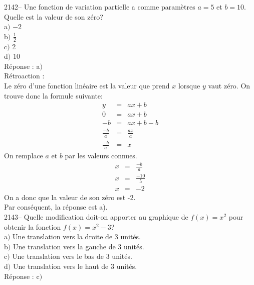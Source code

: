 \documentclass[letterpaper, 12pt]{article}
\begin{document}
2142-- Une fonction de variation partielle a comme param\`etres $a=5$ et $b=10$. Quelle est la valeur de son z\'ero?\\

a$)$ $-2$\\[2mm]
b$)$ $\frac{1}{2}$\\[2mm]
c$)$ 2\\[2mm]
d$)$ 10\\

R\'eponse : a$)$\\

R\'etroaction :\\
Le z\'ero d'une fonction lin\'eaire est la valeur que prend $x$ lorsque $y$ vaut z\'ero. On trouve donc la formule suivante:
\begin{eqnarray*}
 y&=&ax+b\\
 0&=&ax+b\\
 -b&=&ax+b-b\\
 \frac{-b}{a}&=&\frac{ax}{a}\\
 \frac{-b}{a}&=&x
\end{eqnarray*}
On remplace $a$ et $b$ par les valeurs connues.
\begin{eqnarray*}
x&=&\frac{-b}{a}\\[2mm]
 x&=&\frac{-10}{5}\\[2mm]
x&=&-2
\end{eqnarray*}
On a donc que la valeur de son z\'ero est -2.\\
Par cons\'equent, la r\'eponse est a).\\

2143-- Quelle modification doit-on apporter au graphique de $f(x)=x^{2}$ pour obtenir la fonction $f(x)=x^{2}-3$?\\

a$)$ Une translation vers la droite de 3 unit\'es.\\
b$)$ Une translation vers la gauche de 3 unit\'es.\\
c$)$ Une translation vers le bas de 3 unit\'es.\\
d$)$ Une translation vers le haut de 3 unit\'es.\\

R\'eponse : c$)$\\
\end{document}
